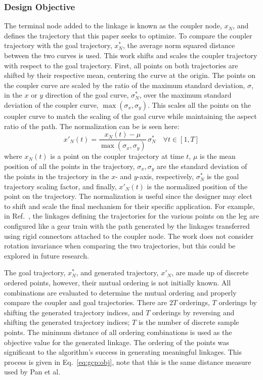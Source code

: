 \subsubsection{Design Objective}\label{sec:design-obj} The terminal node added to the linkage is known as the coupler node, $x_N$, and defines the trajectory that this paper seeks to optimize. To compare the coupler trajectory with the goal trajectory, \( x^*_N \), the average norm squared distance between the two curves is used. This work shifts and scales the coupler trajectory with respect to the goal trajectory. First, all points on both trajectories are shifted by their respective mean, centering the curve at the origin. The points on the coupler curve are scaled by the ratio of the maximum standard deviation, \( \sigma \), in the \( x \) or \( y \) direction of the goal curve, \( \sigma^*_N \), over the maximum standard deviation of the coupler curve, \( \max(\sigma_x, \sigma_y) \). This scales all the points on the coupler curve to match the scaling of the goal curve while maintaining the aspect ratio of the path. The normalization can be is seen here:
\begin{equation}
x'_N(t) = \frac{x_N(t) - \mu}{\max(\sigma_x, \sigma_y)} \, \sigma^*_N \quad \forall t \in [1, T]
\end{equation}
where \( x_N(t) \) is a point on the coupler trajectory at time \( t \), \( \mu \) is the mean position of all the points in the trajectory, \( \sigma_x, \sigma_y \) are the standard deviation of the points in the trajectory in the \( x \)- and \( y \)-axis, respectively, \( \sigma^*_N \) is the goal trajectory scaling factor, and finally, \( x'_N(t) \) is the normalized position of the point on the trajectory. The normalization is useful since the designer may elect to shift and scale the final mechanism for their specific application. For example, in Ref.~\cite{plecnik_design_2016}, the linkages defining the trajectories for the various points on the leg are configured like a gear train with the path generated by the linkages transferred using rigid connectors attached to the coupler node. The work does not consider rotation invariance when comparing the two trajectories, but this could be explored in future research.

The goal trajectory, \( x^*_N \), and generated trajectory, \( x'_N \), are made up of discrete ordered points, however, their mutual ordering is not initially known. All combinations are evaluated to determine the mutual ordering and properly compare the coupler and goal trajectories. There are \( 2T \) orderings, \( T \) orderings by shifting the generated trajectory indices, and \( T \) orderings by reversing and shifting the generated trajectory indices; \( T \) is the number of discrete sample points. The minimum distance of all ordering combinations is used as the objective value for the generated linkage. The ordering of the points was significant to the algorithm’s success in generating meaningful linkages. This process is given in Eq.~\eqref{eq:gcp:obj}, note that this is the same distance measure used by Pan et al.~\cite{pan_joint_2022}

